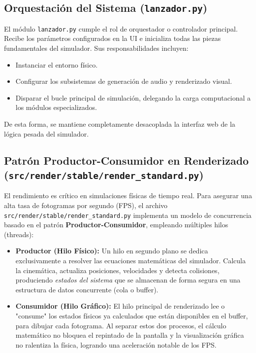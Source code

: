 \documentclass[12pt, openany]{book}
\begin{document}
\subsection{Orquestación del Sistema (\texttt{lanzador.py})}
El módulo \texttt{lanzador.py} cumple el rol de orquestador o controlador principal. Recibe los parámetros configurados en la UI e inicializa todas las piezas fundamentales del simulador. Sus responsabilidades incluyen:
\begin{itemize}
    \item Instanciar el entorno físico.
    \item Configurar los subsistemas de generación de audio y renderizado visual.
    \item Disparar el bucle principal de simulación, delegando la carga computacional a los módulos especializados.
\end{itemize}
De esta forma, se mantiene completamente desacoplada la interfaz web de la lógica pesada del simulador.

\subsection{Patrón Productor-Consumidor en Renderizado (\texttt{src/render/stable/render\_standard.py})}
El rendimiento es crítico en simulaciones físicas de tiempo real. Para asegurar una alta tasa de fotogramas por segundo (FPS), el archivo \texttt{src/render/stable/render\_standard.py} implementa un modelo de concurrencia basado en el patrón \textbf{Productor-Consumidor}, empleando múltiples hilos (threads):

\begin{itemize}
    \item \textbf{Productor (Hilo Físico):} Un hilo en segundo plano se dedica exclusivamente a resolver las ecuaciones matemáticas del simulador. Calcula la cinemática, actualiza posiciones, velocidades y detecta colisiones, produciendo \textit{estados del sistema} que se almacenan de forma segura en una estructura de datos concurrente (cola o buffer).
    \item \textbf{Consumidor (Hilo Gráfico):} El hilo principal de renderizado lee o "consume" los estados físicos ya calculados que están disponibles en el buffer, para dibujar cada fotograma. Al separar estos dos procesos, el cálculo matemático no bloquea el repintado de la pantalla y la visualización gráfica no ralentiza la física, logrando una aceleración notable de los FPS.
\end{itemize}
\end{document}
